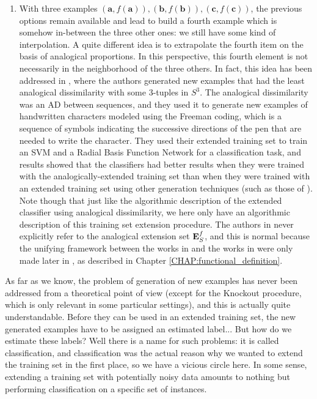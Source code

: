\begin{enumerate}
\item With three examples $(\mathbf{a},f(\mathbf{a})),
  (\mathbf{b},f(\mathbf{b})), (\mathbf{c},f(\mathbf{c}))$, the previous options
    remain available and lead to build a fourth example which is somehow
    in-between the three other ones: we still have some kind of interpolation.
    A quite different idea is to extrapolate the fourth item on the basis of
    analogical proportions.  In this perspective, this fourth element is not
    necessarily in the neighborhood of the three others. In fact, this idea has
    been addressed in \cite{BayMouMicAnqECML07}, where the authors generated
    new examples that had the least analogical dissimilarity with some
    $3$-tuples in $S^3$. The analogical dissimilarity was an AD between
    sequences, and they used it to generate new examples of handwritten
    characters modeled using the Freeman coding, which is a sequence of symbols
    indicating the successive directions of the pen that are needed to write
    the character. They used their extended training set to train an SVM and a
    Radial Basis Function Network for a classification task, and results showed
    that the classifiers had better results when they were trained with the
    analogically-extended training set than when they were trained with an
    extended training set using other generation techniques (such as those of
    \cite{CanPerArlLlo06}).  Note though that just like the algorithmic
    description of the extended classifier using analogical dissimilarity, we
    here only have an algorithmic description of this training set extension
    procedure. The authors in \cite{BayMouMicAnqECML07} never explicitly refer
    to the analogical extension set $\mathbf{E}_{S}^{f}$, and this is normal because the
    unifying framework between the works in \cite{BayMicDelIJCAI07} and the
    works in \cite{StrYvoCNLL05} were only made later in
    \cite{HugPraRicSerECAI16}, as described in Chapter
    \ref{CHAP:functional_definition}.
\end{enumerate}


As far as we know, the problem of generation of new examples has never been
addressed from a theoretical point of view (except for the Knockout procedure,
which is only relevant in some particular settings), and this is actually quite
understandable. Before they can be used in an extended training set, the new
generated examples have to be assigned an estimated label... But how do we
estimate these labels? Well there is a name for such problems: it is called
classification, and classification was the actual reason why we wanted to
extend the training set in the first place, so we have a vicious circle here.
In some sense, extending a training set with potentially noisy data
amounts to nothing but performing classification on a specific set of
instances.

